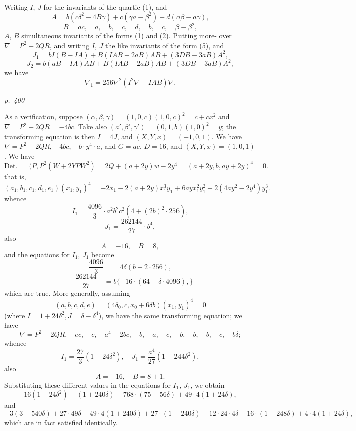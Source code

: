 \documentclass[11pt,a4paper]{book}
\begin{document}
Writing $I$, $J$ for the invariants of the quartic (1), and
\[
A = b(c\delta^2 - 4B\gamma) + c(\gamma a - \beta^2) + d(a\beta - a\gamma),
\]
\[
B = a c, \quad a, \quad b, \quad c, \quad d, \quad b, \quad c, \quad \beta - \beta^2,
\]
$A$, $B$ simultaneous invariants of the forms (1) and (2). Putting more-
over $\nabla = P^2 - 2QR$, and writing $I$, $J$ the like invariants of the form (5), and
\[
J_1 = b I (B - I A) + B(I A B - 2 a B)A B + (3 D B - 3 a B)A^2,
\]
\[
J_2 = b (a B - I A)A B + B(I A B - 2 a B)A B + (3 D B - 3 a B)A^2,
\]
we have
\[
\nabla_1 = 256 \nabla^2 (I^2 \nabla - I A B) \nabla.
\]

\clearpage

\bigskip
\textit{p.~400}
\smallskip

\noindent
As a verification, suppose $(\alpha, \beta, \gamma) = (1, 0, c)(1, 0, c)^2 = c + cx^2$ and $\nabla = P^2 - 2QR = -4 bc$.
Take also $(a', \beta', \gamma') = (0, 1, b)(1, 0)^2 = y$; the transforming equation is then $I = 4 J$, and
$(X, Y, x) = (-1, 0, 1)$. We have $\nabla = P^2 - 2 Q R$, $-4 b c$, $+ b \cdot y^4 \cdot a$, and $G = a c$, $D = 16$, and
$(X, Y, x) = (1, 0, 1)$. We have
\[
\text{Det. } = (P, P^2(W + 2Y P W^2) = 2Q + (a + 2y)w - 2y^4 = (a + 2y, b, ay + 2y)^4 = 0.
\]
that is,
\[
(a_1, b_1, c_1, d_1, e_1)(x_1, y_1)^4 = -2x_1 - 2(a + 2y)x_1^3y_1 + 6 a y x_1^2 y_1^2 + 2 (4 a y^2 - 2y^4)y_1^3.
\]
whence
\[
I_1 = \frac{4096}{3} \cdot a^2 b^2 c^2 (4 + (2 b)^2 \cdot 256),
\]
\[
J_1 = \frac{262144}{27} \cdot b^4,
\]
also
\[
A = -16, \quad B = 8,
\]
and the equations for $I_1$, $J_1$ become
\[
\frac{4096}{3} \quad = 4 \delta (b + 2 \cdot 256),
\]
\[
\quad \frac{262144}{27} \quad = b\{-16 \cdot (64 + \delta \cdot 4096),\}
\]
which are true. More generally, assuming
\[
(a, b, c, d, e) = (4 \delta_0, c, x_0 + 6 \delta b)(x_1, y_1)^4 = 0
\]
(where $I = 1 + 24 \delta^2, J = \delta - \delta^4$), we have the same transforming equation; we have
\[
\nabla = P^2 - 2 Q R, \quad e c, \quad c, \quad a^4 - 2 b c, \quad b, \quad a, \quad c, \quad b, \quad b, \quad b, \quad c, \quad b\delta;
\]
whence
\[
I_1 = \frac{27}{3}(1 - 24 \delta^2), \quad J_1 = \frac{a^4}{27}(1 - 244 \delta^2),
\]
also
\[
A = -16, \quad B = 8 + 1.
\]
Substituting these different values in the equations for $I_1$, $J_1$, we obtain
\[
16 (1 - 24 \delta^2) - (1 + 240 \delta) - 768 \cdot (75 - 56 \delta) + 49 \cdot 4 (1 + 24 \delta),
\]
and
\[
-3 (3 - 540 \delta) + 27 \cdot 49 \delta - 49 \cdot 4 (1 + 240 \delta) + 27 \cdot (1 + 240 \delta) - 12 \cdot 24 \cdot 4 \delta - 16 \cdot (1 + 248 \delta) + 4 \cdot 4 (1 + 24 \delta),
\]
which are in fact satisfied identically.
\end{document}
